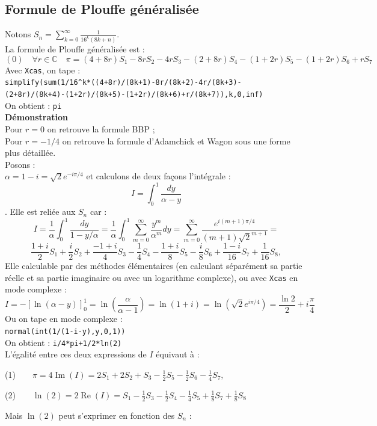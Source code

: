 \documentclass[a4paper,11pt]{book}
\begin{document}
\subsection{Formule de Plouffe g\'en\'eralis\'ee}
Notons $\displaystyle S_n=\sum_{k=0}^\infty \frac{1}{16^k(8k+n)}$.\\
La formule de Plouffe g\'en\'eralis\'ee est :
$$(0)\quad \forall r \in \mathbb{C}\quad\pi=(4+8r)S_1-8rS_2 -4rS_3 -(2+8r)S_4-(1+2r)S_5-(1+2r)S_6+rS_7$$
Avec {\tt Xcas}, on tape :\\
{\tt simplify(sum(1/16\verb|^|k*((4+8r)/(8k+1)-8r/(8k+2)-4r/(8k+3)-\\
(2+8r)/(8k+4)-(1+2r)/(8k+5)-(1+2r)/(8k+6)+r/(8k+7)),k,0,inf) }\\
On obtient : {\tt pi}\\
{\bf D\'emonstration}\\
Pour $r=0$ on retrouve la formule BBP ;\\
Pour $r=-1/4$ on retrouve la formule d'Adamchick et Wagon sous une forme 
plus d\'etaill\'ee.\\
Posons :\\
$\alpha=1-i=\sqrt 2e^{-i\pi/4}$ et calculons de deux façons l'int\'egrale :
$$I=\int_0^1\frac{dy}{\alpha-y}$$.
Elle est reli\'ee aux $S_n$ car :
$$I=\frac{1}{\alpha}\int_0^1\frac{dy}{1-y/\alpha}= \frac1\alpha\int_0^1\sum_{m=0}^\infty\frac{y^m}{\alpha^m}dy=\sum_{m=0}^\infty\frac{e^{i(m+1)\pi/4}}{(m+1)\sqrt 2^{m+1}}=$$
$$\frac{1+i}{2}S_1+\frac{i}{2}S_2+\frac{-1+i}{4}S_3-\frac{1}{4}S_4-\frac{1+i}{8}S_5-\frac {i}{8}S_6+\frac{1-i}{16}S_7+\frac{1}{16}S_8,$$
Elle calculable par des m\'ethodes \'el\'ementaires (en calculant 
s\'epar\'ement sa partie r\'eelle et sa partie imaginaire ou avec un logarithme
 complexe), ou avec {\tt Xcas} en mode complexe :
$$I=-\left[\ln(\alpha-y)\right]_0^1=\ln\left(\frac\alpha{\alpha-1}\right)=\ln(1+i)=\ln(\sqrt 2e^{i\pi/4})=\frac{\ln 2}2+i\frac\pi4$$
Ou on tape  en mode complexe :\\
{\tt normal(int(1/(1-i-y),y,0,1))}\\
On obtient : {\tt i/4*pi+1/2*ln(2)}\\
L'égalit\'e entre ces deux expressions de $I$ \'equivaut \`a :

    (1)$\qquad\pi=4\mathop{Im}(I)=2S_1+2S_2+S_3-\frac 12S_5-\frac 12S_6-\frac 14S_7,$

    (2)$\qquad\ln(2)=2\mathop{Re}(I)= S_1-\frac 12S_3-\frac 12S_4-\frac 14S_5+\frac 18S_7+\frac 18S_8$

Mais $\ln(2)$ peut s'exprimer en fonction des $S_n$ :
\end{document}
